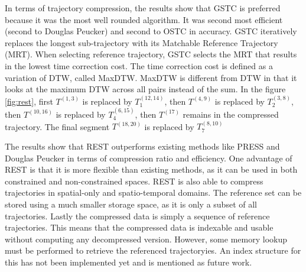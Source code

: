 In terms of trajectory compression, the results show that GSTC is preferred because it was the most well rounded algorithm. It was second most efficient (second to Douglas Peucker) and second to OSTC in accuracy. GSTC iteratively replaces the longest sub-trajectory with its Matchable Reference Trajectory (MRT). When selecting reference trajectory, GSTC selects the MRT that results in the lowest time correction cost. The time correction cost is defined as a variation of DTW, called MaxDTW. MaxDTW is different from DTW in that it looks at the maximum DTW across all pairs instead of the sum. In the figure \ref{fig:rest}, first $T^{(1,3)}$ is replaced by $T_1^{(12,14)}$, then $T^{(4,9)}$ is replaced by $T_2^{(3,8)}$, then $T^{(10,16)}$ is replaced by $T_4^{(6,15)}$, then $T^{(17)}$ remains in the compressed trajectory. The final segment $T^{(18,20)}$ is replaced by $T_7^{(8,10)}$

The results show that REST outperforms existing methods like PRESS and Douglas Peucker in terms of compression ratio and efficiency. One advantage of REST is that it is more flexible than existing methods, as it can be used in both constrained and non-constrained spaces. REST is also able to compress trajectories in spatial-only and spatio-temporal domains. The reference set can be stored using a much smaller storage space, as it is only a subset of all trajectories. Lastly the compressed data is simply a sequence of reference trajectories. This means that the compressed data is indexable and usable without computing any decompressed version. However, some memory lookup must be performed to retrieve the referenced trajectoryies. An index structure for this has not been implemented yet and is mentioned as future work.

